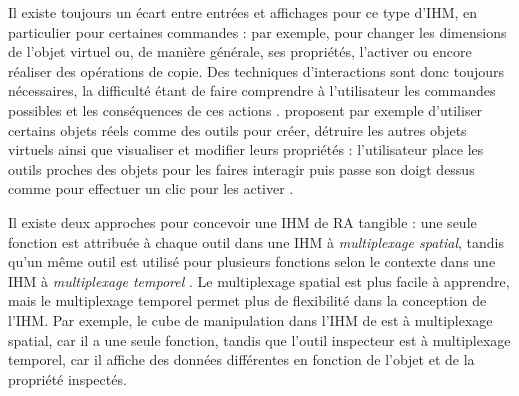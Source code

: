 
Il existe toujours un écart entre entrées et affichages pour ce type d'IHM, en particulier pour certaines commandes : par exemple, pour changer les dimensions de l'objet virtuel ou, de manière générale, ses propriétés, l'activer ou encore réaliser des opérations de copie. Des techniques d'interactions sont donc toujours nécessaires, la difficulté étant de faire comprendre à l'utilisateur les commandes possibles et les conséquences de ces actions \citep{Zhou2008}. \cite{Lee2004} proposent par exemple d'utiliser certains objets réels comme des outils pour créer, détruire les autres objets virtuels ainsi que visualiser et modifier leurs propriétés : l'utilisateur place les outils proches des objets pour les faires interagir puis passe son doigt dessus comme pour effectuer un clic pour les activer .

Il existe deux approches pour concevoir une IHM de RA tangible : une seule fonction est attribuée à chaque outil dans une IHM à \emph{multiplexage spatial}, tandis qu'un même outil est utilisé pour plusieurs fonctions selon le contexte dans une IHM à \emph{multiplexage temporel} \cite{Billinghurst2015}. Le multiplexage spatial est plus facile à apprendre, mais le multiplexage temporel permet plus de flexibilité dans la conception de l'IHM. Par exemple, le cube de manipulation dans l'IHM de \cite{Lee2004} est à multiplexage spatial, car il a une seule fonction, tandis que l'outil inspecteur est à multiplexage temporel, car il affiche des données différentes en fonction de l'objet et de la propriété inspectés.


